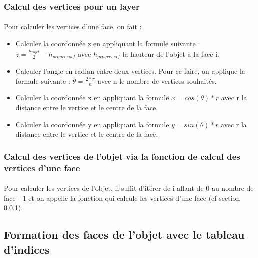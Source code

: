 \documentclass[article, backcover, french, nodocumentinfo]{upmethodology-document}
\begin{document}
	\subsubsection{Calcul des vertices pour un layer}\label{a}
		\paragraph{} Pour calculer les vertices d'une face, on fait : 
		\begin{itemize}
			\item Calculer la coordonnée z en appliquant la formule suivante : $z = \frac{h_{objet}}{2} - h_{progressif}$ avec $h_{progressif}$ la hauteur de l'objet à la face i.
			\item Calculer l'angle en radian entre deux vertices. Pour ce faire, on applique la formule suivante : $\theta = \frac{2*\pi}{n}$ avec n le nombre de vertices souhaités.
			\item Calculer la coordonnée x en appliquant la formule $x = cos(\theta)*r$ avec r la distance entre le vertice et le centre de la face.
			\item Calculer la coordonnée y en appliquant la formule $y = sin(\theta)*r$ avec r la distance entre le vertice et le centre de la face.
		\end{itemize}
	\subsubsection{Calcul des vertices de l'objet via la fonction de calcul des vertices d'une face}
	\paragraph{} Pour calculer les vertices de l'objet, il suffit d'itérer de i allant de 0 au nombre de face - 1 et on appelle la fonction qui calcule les vertices d'une face (cf section \ref{a}).
	\subsection{Formation des faces de l'objet avec le tableau d'indices}
\end{document}
